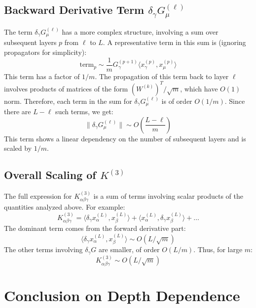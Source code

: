 \documentclass[a4paper]{article}
\begin{document}
\subsection{Backward Derivative Term $\delta_\gamma G^{(\ell)}_\mu$}

The term $\delta_\gamma G^{(\ell)}_\mu$ has a more complex structure, involving a sum over subsequent layers $p$ from $\ell$ to $L$. A representative term in this sum is (ignoring propagators for simplicity):
\begin{equation}
    \text{term}_p \sim \frac{1}{m} G^{(p+1)}_\gamma \langle x^{(p)}_\gamma, x^{(p)}_\mu \rangle
\end{equation}
This term has a factor of $1/m$. The propagation of this term back to layer $\ell$ involves products of matrices of the form $(W^{(k)})^T/\sqrt{m}$, which have $O(1)$ norm. Therefore, each term in the sum for $\delta_\gamma G^{(\ell)}_\mu$ is of order $O(1/m)$. Since there are $L-\ell$ such terms, we get:
\begin{equation}
    \|\delta_\gamma G^{(\ell)}_\mu\| \sim O\left(\frac{L-\ell}{m}\right)
\end{equation}
This term shows a linear dependency on the number of subsequent layers and is scaled by $1/m$.

\subsection{Overall Scaling of $K^{(3)}$}

The full expression for $K^{(3)}_{\alpha\beta\gamma}$ is a sum of terms involving scalar products of the quantities analyzed above. For example:
\begin{equation}
K^{(3)}_{\alpha\beta\gamma} = \langle \delta_\gamma x^{(L)}_\alpha, x^{(L)}_\beta \rangle + \langle x^{(L)}_\alpha, \delta_\gamma x^{(L)}_\beta \rangle + \dots
\end{equation}
The dominant term comes from the forward derivative part:
\begin{equation}
    \langle \delta_\gamma x^{(L)}_\alpha, x^{(L)}_\beta \rangle \sim O(L/\sqrt{m})
\end{equation}
The other terms involving $\delta_\gamma G$ are smaller, of order $O(L/m)$. Thus, for large $m$:
\begin{equation}
    K^{(3)}_{\alpha\beta\gamma} \sim O(L/\sqrt{m})
\end{equation}

\section{Conclusion on Depth Dependence}
\end{document}
